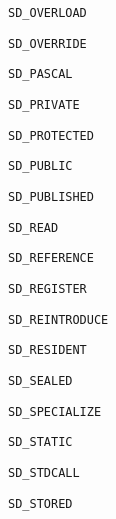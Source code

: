 \documentclass{report}
\begin{document}
\begin{list}{}
\begin{description}
\item[\texttt{SD{\_}OVERLOAD}] \label{PasDoc_Tokenizer-SD_OVERLOAD}
\index{}
 
\item[\texttt{SD{\_}OVERRIDE}] \label{PasDoc_Tokenizer-SD_OVERRIDE}
\index{}
 
\item[\texttt{SD{\_}PASCAL}] \label{PasDoc_Tokenizer-SD_PASCAL}
\index{}
 
\item[\texttt{SD{\_}PRIVATE}] \label{PasDoc_Tokenizer-SD_PRIVATE}
\index{}
 
\item[\texttt{SD{\_}PROTECTED}] \label{PasDoc_Tokenizer-SD_PROTECTED}
\index{}
 
\item[\texttt{SD{\_}PUBLIC}] \label{PasDoc_Tokenizer-SD_PUBLIC}
\index{}
 
\item[\texttt{SD{\_}PUBLISHED}] \label{PasDoc_Tokenizer-SD_PUBLISHED}
\index{}
 
\item[\texttt{SD{\_}READ}] \label{PasDoc_Tokenizer-SD_READ}
\index{}
 
\item[\texttt{SD{\_}REFERENCE}] \label{PasDoc_Tokenizer-SD_REFERENCE}
\index{}
 
\item[\texttt{SD{\_}REGISTER}] \label{PasDoc_Tokenizer-SD_REGISTER}
\index{}
 
\item[\texttt{SD{\_}REINTRODUCE}] \label{PasDoc_Tokenizer-SD_REINTRODUCE}
\index{}
 
\item[\texttt{SD{\_}RESIDENT}] \label{PasDoc_Tokenizer-SD_RESIDENT}
\index{}
 
\item[\texttt{SD{\_}SEALED}] \label{PasDoc_Tokenizer-SD_SEALED}
\index{}
 
\item[\texttt{SD{\_}SPECIALIZE}] \label{PasDoc_Tokenizer-SD_SPECIALIZE}
\index{}
 
\item[\texttt{SD{\_}STATIC}] \label{PasDoc_Tokenizer-SD_STATIC}
\index{}
 
\item[\texttt{SD{\_}STDCALL}] \label{PasDoc_Tokenizer-SD_STDCALL}
\index{}
 
\item[\texttt{SD{\_}STORED}] \label{PasDoc_Tokenizer-SD_STORED}
\index{}
 

\end{description}
\end{list}
\end{document}
